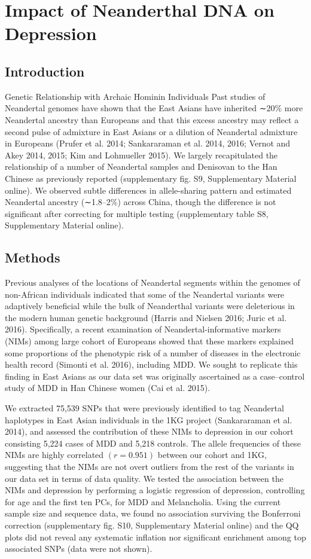 \chapter{Impact of Neanderthal DNA on Depression}

\section{Introduction}
Genetic Relationship with Archaic Hominin Individuals
Past studies of Neandertal genomes have shown that the East Asians have inherited ∼20\% more Neandertal ancestry than Europeans and that this excess ancestry may reflect a second pulse of admixture in East Asians or a dilution of Neandertal admixture in Europeans (Prufer et al. 2014; Sankararaman et al. 2014, 2016; Vernot and Akey 2014, 2015; Kim and Lohmueller 2015). We largely recapitulated the relationship of a number of Neandertal samples and Denisovan to the Han Chinese as previously reported (supplementary fig. S9, Supplementary Material online). We observed subtle differences in allele-sharing pattern and estimated Neandertal ancestry (∼1.8–2\%) across China, though the difference is not significant after correcting for multiple testing (supplementary table S8, Supplementary Material online).
\section{Methods}
Previous analyses of the locations of Neandertal segments within the genomes of non-African individuals indicated that some of the Neandertal variants were adaptively beneficial while the bulk of Neanderthal variants were deleterious in the modern human genetic background (Harris and Nielsen 2016; Juric et al. 2016). Specifically, a recent examination of Neandertal-informative markers (NIMs) among large cohort of Europeans showed that these markers explained some proportions of the phenotypic risk of a number of diseases in the electronic health record (Simonti et al. 2016), including MDD. We sought to replicate this finding in East Asians as our data set was originally ascertained as a case–control study of MDD in Han Chinese women (Cai et al. 2015).

We extracted 75,539 SNPs that were previously identified to tag Neandertal haplotypes in East Asian individuals in the 1KG project (Sankararaman et al. 2014), and assessed the contribution of these NIMs to depression in our cohort consisting 5,224 cases of MDD and 5,218 controls. The allele frequencies of these NIMs are highly correlated $(r=0.951)$ between our cohort and 1KG, suggesting that the NIMs are not overt outliers from the rest of the variants in our data set in terms of data quality. We tested the association between the NIMs and depression by performing a logistic regression of depression, controlling for age and the first ten PCs, for MDD and Melancholia. Using the current sample size and sequence data, we found no association surviving the Bonferroni correction (supplementary fig. S10, Supplementary Material online) and the QQ plots did not reveal any systematic inflation nor significant enrichment among top associated SNPs (data were not shown).


